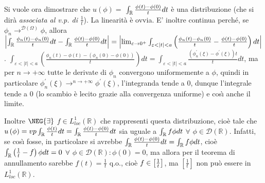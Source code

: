 \documentclass{article}
\begin{document}
Si vuole ora dimostrare che $u\left( \phi \right) =$ $\int_{%
\mathbb{R}
}\frac{\phi \left( t\right) -\phi \left( 0\right) }{t}dt$ \`{e} una
distribuzione (che si dir\`{a} \textit{associata al v.p. di }$\frac{1}{t}$).
La linearit\`{a} \`{e} ovvia. E' inoltre continua perch\'{e}, se $\phi
_{n}\rightarrow ^{\mathcal{D}\left( \Omega \right) }\phi $, allora $%
\left\vert \int_{%
\mathbb{R}
}\frac{\phi _{n}\left( t\right) -\phi _{n}\left( 0\right) }{t}dt-\int_{%
\mathbb{R}
}\frac{\phi \left( t\right) -\phi \left( 0\right) }{t}dt\right\vert
=\left\vert \lim_{\varepsilon \rightarrow 0^{+}}\int_{\varepsilon
<\left\vert t\right\vert <a}\left( \frac{\phi _{n}\left( t\right) -\phi
_{n}\left( 0\right) }{t}-\frac{\phi \left( t\right) -\phi \left( 0\right) }{t%
}\right) dt\right\vert $. $\int_{\varepsilon <\left\vert t\right\vert
<a}\left( \frac{\phi _{n}\left( t\right) -\phi \left( t\right) -\left( \phi
_{n}\left( 0\right) -\phi \left( 0\right) \right) }{t}\right)
dt=\int_{\varepsilon <\left\vert t\right\vert <a}\frac{\left( \phi
_{n}^{\prime }\left( \xi \right) -\phi ^{\prime }\left( \xi \right) \right) t%
}{t}dt$, ma per $n\rightarrow +\infty $ tutte le derivate di $\phi _{n}$
convergono uniformemente a $\phi $, quindi in particolare $\phi _{n}^{\prime
}\left( \xi \right) \rightarrow ^{n\rightarrow +\infty }\phi ^{\prime
}\left( \xi \right) $, l'integranda tende a $0$, dunque l'integrale tende a $%
0$ (lo scambio \`{e} lecito grazie alla convergenza uniforme) e cos\`{\i}
anche il limite.

Inoltre $\NEG{\exists}$ $f\in L_{loc}^{1}\left( 
\mathbb{R}
\right) $ che rappresenti questa distribuzione, cio\`{e} tale che $u\left(
\phi \right) =vp\int_{%
\mathbb{R}
}\frac{\phi \left( t\right) }{t}dt=\int_{%
\mathbb{R}
}\frac{\phi \left( t\right) -\phi \left( 0\right) }{t}dt$ sia uguale a $%
\int_{%
\mathbb{R}
}f\phi dt$ $\forall $ $\phi \in \mathcal{D}\left( 
\mathbb{R}
\right) $. Infatti, se cos\`{\i} fosse, in particolare si avrebbe $\int_{%
\mathbb{R}
}\frac{\phi \left( t\right) -\phi \left( 0\right) }{t}dt=\int_{%
\mathbb{R}
}f\phi dt$, cio\`{e} $\int_{%
\mathbb{R}
}\left( \frac{1}{t}-f\right) \phi dt=0$ $\forall $ $\phi \in \mathcal{D}%
\left( 
\mathbb{R}
\right) :\phi \left( 0\right) =0$, ma allora per il teorema di annullamento
sarebbe $f\left( t\right) =\frac{1}{t}$ q.o., cio\`{e} $f\in \left[ \frac{1}{%
t}\right] $, ma $\left[ \frac{1}{t}\right] $ non pu\`{o} essere in $%
L_{loc}^{1}\left( 
\mathbb{R}
\right) $.
\end{document}
